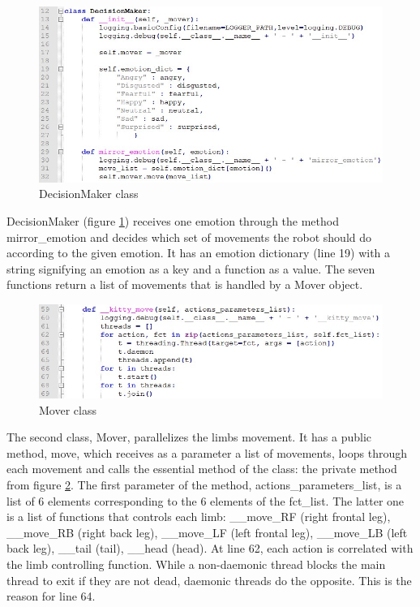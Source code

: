 \documentclass[runningheads,a4paper,12pt]{report}
\begin{document}
\begin{figure}
	\centering

  	\includegraphics[width=\linewidth]{./images/3_decision_maker}\hfill

    \caption{DecisionMaker class}  
    \label{fig:decision-maker}
\end{figure}

DecisionMaker (figure \ref{fig:decision-maker}) receives one emotion through the method mirror\_emotion and decides which set of movements the robot should do according to the given emotion. It has an emotion dictionary (line 19) with a string signifying an emotion as a key and  a function as a value. The seven functions return a list of movements that is handled by a Mover object. 

\begin{figure}
	\centering

  	\includegraphics[width=\linewidth]{./images/3_mover}\hfill

    \caption{Mover class}  
    \label{fig:mover}
\end{figure}

The second class, Mover, parallelizes the limbs movement. It has a public method, move, which receives as a parameter a list of movements, loops through each movement and calls the essential method of the class: the private method from figure \ref{fig:mover}. The first parameter of the method, actions\_parameters\_list, is a list of 6 elements corresponding to the 6 elements of the fct\_list. The latter one is a list of functions that controls each limb: \_\_move\_RF (right frontal leg), \_\_move\_RB (right back leg), \_\_move\_LF (left frontal leg), \_\_move\_LB (left back leg), \_\_tail (tail), \_\_head (head). At line 62, each action is correlated with the limb controlling function. While a non-daemonic thread blocks the main thread to exit if they are not dead, daemonic threads do the opposite. This is the reason for line 64. 
\end{document}
